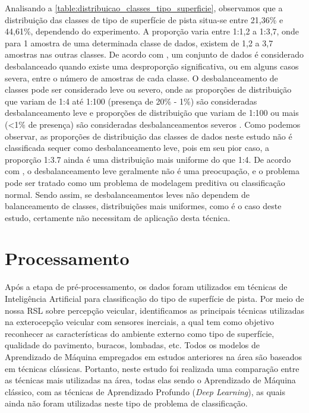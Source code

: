 Analisando a \autoref{table:distribuicao_classes_tipo_superficie}, observamos que a distribuição das classes de tipo de superfície de pista situa-se entre 21,36\% e 44,61\%, dependendo do experimento. A proporção varia entre 1:1,2 a 1:3,7, onde para 1 amostra de uma determinada classe de dados, existem de 1,2 a 3,7 amostras nas outras classes. De acordo com \cite{Fernandez2018}, um conjunto de dados é considerado desbalanceado quando existe uma desproporção significativa, ou em alguns casos severa, entre o número de amostras de cada classe. O desbalanceamento de classes pode ser considerado leve ou severo, onde as proporções de distribuição que variam de 1:4 até 1:100 (presença de 20\% - 1\%) são consideradas desbalanceamento leve e proporções de distribuição que variam de 1:100 ou mais (<1\% de presença) são consideradas desbalanceamentos severos \cite{Krawczyk2016,Brownlee2020}. Como podemos observar, as proporções de distribuição das classes de dados neste estudo não é classificada sequer como desbalanceamento leve, pois em seu pior caso, a proporção 1:3.7 ainda é uma distribuição mais uniforme do que 1:4. De acordo com \cite{Brownlee2020}, o desbalanceamento leve geralmente não é uma preocupação, e o problema pode ser tratado como um problema de modelagem preditiva ou classificação normal. Sendo assim, se desbalanceamentos leves não dependem de balanceamento de classes, distribuições mais uniformes, como é o caso deste estudo, certamente não necessitam de aplicação desta técnica.

\section{Processamento}

Após a etapa de pré-processamento, os dados foram utilizados em técnicas de Inteligência Artificial para classificação do tipo de superfície de pista. Por meio de nossa RSL sobre percepção veicular, identificamos as principais técnicas utilizadas na exterocepção veicular com sensores inerciais, a qual tem como objetivo reconhecer as características do ambiente externo como tipo de superfície, qualidade do pavimento, buracos, lombadas, etc. Todos os modelos de Aprendizado de Máquina empregados em estudos anteriores na área são baseados em técnicas clássicas. Portanto, neste estudo foi realizada uma comparação entre as técnicas mais utilizadas na área, todas elas sendo o Aprendizado de Máquina clássico, com as técnicas de Aprendizado Profundo (\textit{Deep Learning}), as quais ainda não foram utilizadas neste tipo de problema de classificação.

